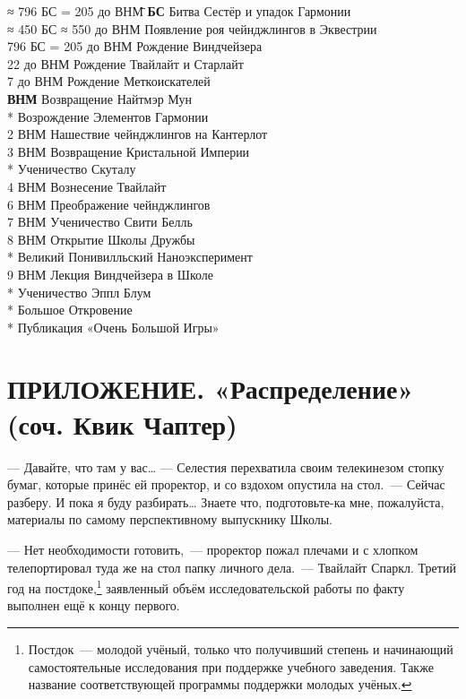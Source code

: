 \documentclass[fontsize=11pt,a5paper,titlepage=firstcover]{scrbook}
\begin{document}
\begin{tabbing}
	≈ 796 БС = 205 до ВНМ\hspace{1em}\=\kill
	\textbf{БС} \> Битва Сестёр и упадок Гармонии\\[\ado]
	≈ 450 БС ≈ 550 до ВНМ \> Появление роя чейнджлингов в Эквестрии\\[\ado]
	796 БС = 205 до ВНМ \> Рождение Виндчейзера\\[\ado]
	22 до ВНМ \> Рождение Твайлайт и Старлайт\\[\ado]
	7 до ВНМ \> Рождение Меткоискателей\\[\ado]
	\textbf{ВНМ} \> Возвращение Найтмэр Мун\\*
	  \> Возрождение Элементов Гармонии\\[\ado]
	2 ВНМ \> Нашествие чейнджлингов на Кантерлот\\[\ado]
	3 ВНМ \> Возвращение Кристальной Империи\\*
	       \> Ученичество Скуталу\\[\ado]
	4 ВНМ \> Вознесение Твайлайт\\[\ado]
	6 ВНМ \> Преображение чейнджлингов\\[\ado]
	7 ВНМ \> Ученичество Свити Белль\\[\ado]
	8 ВНМ \> Открытие Школы Дружбы\\*
	      \> Великий Понивилльский Наноэксперимент\\[\ado]
	9 ВНМ \> Лекция Виндчейзера в Школе\\*
	      \> Ученичество Эппл Блум\\*
	      \> Большое Откровение\\*
	      \> Публикация «Очень Большой Игры»
\end{tabbing} 


\chapter*{ПРИЛОЖЕНИЕ. «Распределение» (соч. Квик Чаптер)}

--- Давайте, что там у вас{\ldots} --- Селестия перехватила своим телекинезом стопку бумаг, которые принёс ей проректор, и со вздохом опустила на стол.~--- Сейчас разберу. И пока я буду разбирать{\ldots} Знаете что, подготовьте-ка мне, пожалуйста, материалы по самому перспективному выпускнику Школы.

--- Нет необходимости готовить,~--- проректор пожал плечами и с хлопком телепортировал туда же на стол папку личного дела.~--- Твайлайт Спаркл. Третий год на постдоке,\footnote{Постдок --- молодой учёный, только что получивший степень и начинающий самостоятельные исследования при поддержке учебного заведения. Также название соответствующей программы поддержки молодых учёных.} заявленный объём исследовательской работы по факту выполнен ещё к концу первого.
\end{document}
